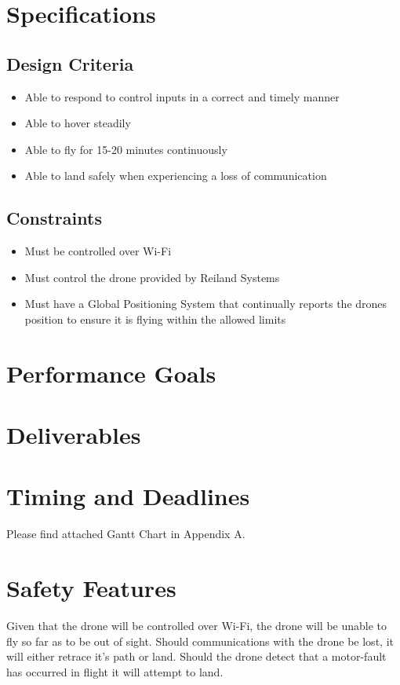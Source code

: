 \documentclass[draft]{article}
\begin{document}
\section{Specifications}
\subsection{Design Criteria}
\begin{itemize}
	\item Able to respond to control inputs in a correct and timely manner
	\item Able to hover steadily 
	\item Able to fly for 15-20 minutes continuously
	\item Able to land safely when experiencing a loss of communication
\end{itemize}
\subsection{Constraints}
\begin{itemize}
	\item Must be controlled over Wi-Fi
	\item Must control the drone provided by Reiland Systems
	\item Must have a Global Positioning System that continually reports the drones position to ensure it is flying within the allowed limits
\end{itemize}
\section{Performance Goals}

\section{Deliverables}

\section{Timing and Deadlines}
Please find attached Gantt Chart in Appendix A.
\section{Safety Features}
Given that the drone will be controlled over Wi-Fi, the drone will be unable to fly so far as to be out of sight.  Should communications with the drone be lost, it will either retrace it's path or land.  Should the drone detect that a motor-fault has occurred in flight it will attempt to land.
\end{document}
